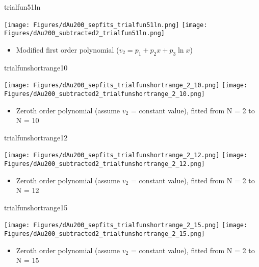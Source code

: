 \documentclass[aspectratio=169,compress,10pt]{beamer}
\begin{document}
\begin{frame}{trialfun51ln}
\begin{center}
\texttt{[image: Figures/dAu200\_sepfits\_trialfun51ln.png]}
\texttt{[image: Figures/dAu200\_subtracted2\_trialfun51ln.png]}
\end{center}
\begin{itemize}
\item Modified first order polynomial ($v_2 = p_1 + p_2x + p_3\ln x$)
\end{itemize}
\end{frame}



\begin{frame}{trialfunshortrange10}
\begin{center}
\texttt{[image: Figures/dAu200\_sepfits\_trialfunshortrange\_2\_10.png]}
\texttt{[image: Figures/dAu200\_subtracted2\_trialfunshortrange\_2\_10.png]}
\end{center}
\begin{itemize}
\item Zeroth order polynomial (assume $v_2$ = constant value), fitted from N = 2 to N = 10
\end{itemize}
\end{frame}



\begin{frame}{trialfunshortrange12}
\begin{center}
\texttt{[image: Figures/dAu200\_sepfits\_trialfunshortrange\_2\_12.png]}
\texttt{[image: Figures/dAu200\_subtracted2\_trialfunshortrange\_2\_12.png]}
\end{center}
\begin{itemize}
\item Zeroth order polynomial (assume $v_2$ = constant value), fitted from N = 2 to N = 12
\end{itemize}
\end{frame}



\begin{frame}{trialfunshortrange15}
\begin{center}
\texttt{[image: Figures/dAu200\_sepfits\_trialfunshortrange\_2\_15.png]}
\texttt{[image: Figures/dAu200\_subtracted2\_trialfunshortrange\_2\_15.png]}
\end{center}
\begin{itemize}
\item Zeroth order polynomial (assume $v_2$ = constant value), fitted from N = 2 to N = 15
\end{itemize}
\end{frame}
\end{document}

